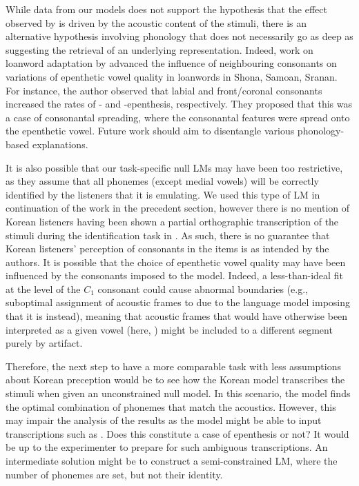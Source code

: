{While data from our models does not support the hypothesis that the effect observed by \cite{durvasula2015} is driven by the acoustic content of the stimuli, there is an alternative hypothesis involving phonology that does not necessarily go as deep as suggesting the retrieval of an underlying representation. Indeed, work on loanword adaptation by \cite{uffmann2006} advanced the influence of neighbouring consonants on variations of epenthetic vowel quality in loanwords in Shona, Samoan, Sranan. For instance, the author observed that labial and front/coronal consonants increased the rates of - and -epenthesis, respectively. They proposed that this was a case of consonantal spreading, where the consonantal features were spread onto the epenthetic vowel. Future work should aim to disentangle various phonology-based explanations.

It is also possible that our task-specific null LMs may have been too restrictive, as they assume that all phonemes (except medial vowels) will be correctly identified by the listeners that it is emulating. We used this type of LM in continuation of the work in the precedent section, however there is no mention of Korean listeners having been shown a partial orthographic transcription of the stimuli during the identification task in \cite{durvasula2015}. As such, there is no guarantee that Korean listeners' perception of consonants in the items is as intended by the authors. It is possible that the choice of epenthetic vowel quality may have been influenced by the consonants imposed to the model. Indeed, a less-than-ideal fit at the level of the $C_{1}$ consonant could cause abnormal boundaries (e.g., suboptimal assignment of acoustic frames to \textipa{[S]} due to the language model imposing that it is \textipa{[s]} instead), meaning that acoustic frames that would have otherwise been interpreted as a given vowel (here, \textipa{[i]}) might be included to a different segment purely by artifact.

Therefore, the next step to have a more comparable task with less assumptions about Korean preception would be to see how the Korean model transcribes the stimuli when given an unconstrained null model. In this scenario, the model finds the optimal combination of phonemes that match the acoustics. However, this may impair the analysis of the results as the model might be able to input transcriptions such as . Does this constitute a case of epenthesis or not? It would be up to the experimenter to prepare for such ambiguous transcriptions. An intermediate solution might be to construct a semi-constrained LM, where the number of phonemes are set, but not their identity. 

}
